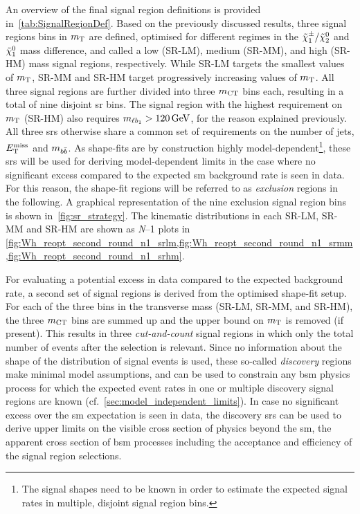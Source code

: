 An overview of the final signal region definitions is provided in~\cref{tab:SignalRegionDef}.
Based on the previously discussed results, three signal regions bins in $m_{\textrm{T}}$ are defined, optimised for different regimes in the $\tilde{\chi}_1^\pm/\tilde{\chi}_2^0$ and $\tilde{\chi}_1^0$ mass difference, and called a low (SR-LM), medium (SR-MM), and high (SR-HM) mass signal regions, respectively.
While SR-LM targets the smallest values of $m_{\textrm{T}}$, SR-MM and SR-HM target progressively increasing values of $m_{\textrm{T}}$.
All three signal regions are further divided into three $m_{\textrm{CT}}$ bins each, resulting in a total of nine disjoint \gls{sr} bins. The signal region with the highest requirement on $m_{\textrm{T}}$ (SR-HM) also requires $\mlb>\SI{120}{\GeV}$, for the reason explained previously.
All three \glspl{sr} otherwise share a common set of requirements on the number of jets, $E_{\textrm{T}}^{\textrm{miss}}$ and $m_{b\bar{b}}$.
As shape-fits are by construction highly model-dependent\footnote{The signal shapes need to be known in order to estimate the expected signal rates in multiple, disjoint signal region bins.}, these \glspl{sr} will be used for deriving model-dependent limits in the case where no significant excess compared to the expected \gls{sm} background rate is seen in data.
For this reason, the shape-fit regions will be referred to as \textit{exclusion} regions in the following. A graphical representation of the nine exclusion signal region bins is shown in~\cref{fig:sr_strategy}.
The kinematic distributions in each SR-LM, SR-MM and SR-HM are shown as \textit{N}--1 plots in \cref{fig:Wh_reopt_second_round_n1_srlm,fig:Wh_reopt_second_round_n1_srmm,fig:Wh_reopt_second_round_n1_srhm}.

For evaluating a potential excess in data compared to the expected background rate, a second set of signal regions is derived from the optimised shape-fit setup.
For each of the three bins in the transverse mass (SR-LM, SR-MM, and SR-HM), the three $m_{\textrm{CT}}$ bins are summed up and the upper bound on $m_{\textrm{T}}$ is removed (if present).
This results in three \textit{cut-and-count} signal regions in which only the total number of events after the selection is relevant. Since no information about the shape of the distribution of signal events is used, these so-called \textit{discovery} regions make minimal model assumptions, and can be used to constrain any \gls{bsm} physics process for which the expected event rates in one or multiple discovery signal regions are known (cf.~\cref{sec:model_independent_limits}).
In case no significant excess over the \gls{sm} expectation is seen in data, the discovery \glspl{sr} can be used to derive upper limits on the visible cross section of physics beyond the \gls{sm}, \ie the apparent cross section of \gls{bsm} processes including the acceptance and efficiency of the signal region selections. 

